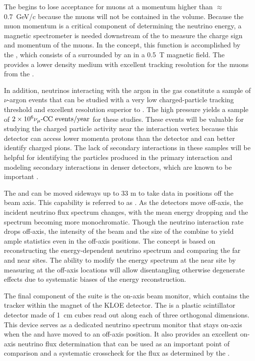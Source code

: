 The  begins to lose acceptance for muons at a momentum higher than 
$\approx$0.7~GeV/c because the muons will not be contained in the  volume.  Because the muon momentum is a critical component of determining the neutrino energy, a magnetic spectrometer is needed downstream of the  to measure the charge sign and momentum of the muons.  In the   concept, this function is accomplished by the , which consists of a  surrounded by an  in a \SI{0.5}{T} magnetic field. The  provides a lower density medium with excellent tracking resolution for the muons from the .  

In addition, neutrinos interacting with the argon in the gas  constitute a sample of $\nu$-argon events that can be studied with a very low charged-particle tracking threshold and excellent resolution superior to . The high pressure yields a sample of $\num{2e6}{\numu \text{-CC events/year}}$ for these studies. These events will be valuable for studying the charged particle activity near the interaction vertex because this detector can access lower momenta protons than the  detector and can better identify charged pions.  The lack of secondary interactions in these samples will be helpful for identifying the particles produced in the primary interaction and modeling secondary interactions in denser detectors, which are known to be important \cite{Friedland:2018vry}.

The  and  can be moved sideways up to 33 m to take data in positions off the beam axis.  This capability is referred to as . As the detectors move off-axis, the incident neutrino flux spectrum changes, with the mean energy dropping and the spectrum becoming more monochromatic.  Though the neutrino interaction rate drops off-axis, the intensity of the beam and the size of the   combine to yield ample statistics even in the off-axis positions.
The  concept is based on reconstructing the energy-dependent neutrino spectrum and
comparing the far and near sites. The ability to modify the energy spectrum at the near site by measuring at the off-axis locations will allow disentangling otherwise degenerate effects due to systematic biases of the energy reconstruction.

The final component of the   suite is the on-axis beam monitor, which contains the
 tracker within the magnet of the KLOE detector.  The  is a plastic scintillator detector made of \SI{1}{cm} cubes read out along each of three orthogonal dimensions.  
This device serves as a dedicated  neutrino spectrum monitor that stays on-axis  when the  and  have moved to an off-axis position. 
It also provides an excellent on-axis neutrino flux determination that can be used as an important point of comparison and a systematic crosscheck for the flux as determined by the .


